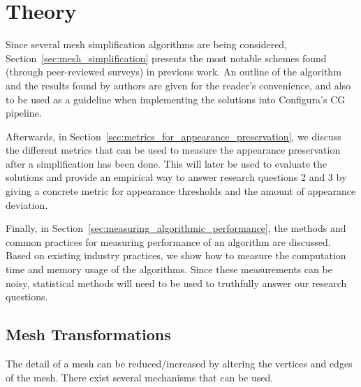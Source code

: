 
\chapter{Theory} \label{ch:theory}

Since several mesh simplification algorithms are being considered, Section~\ref{sec:mesh_simplification} presents the most notable schemes found (through peer-reviewed surveys) in previous work. An outline of the algorithm and the results found by authors are given for the reader's convenience, and also to be used as a guideline when implementing the solutions into Configura's CG pipeline.

Afterwards, in Section~\ref{sec:metrics_for_appearance_preservation}, we discuss the different metrics that can be used to measure the appearance preservation after a simplification has been done. This will later be used to evaluate the solutions and provide an empirical way to answer research questions 2 and 3 by giving a concrete metric for appearance thresholds and the amount of appearance deviation.

Finally, in Section~\ref{sec:measuring_algorithmic_performance}, the methods and common practices for measuring performance of an algorithm are discussed. Based on existing industry practices, we show how to measure the computation time and memory usage of the algorithms. Since these measurements can be noisy, statistical methods will need to be used to truthfully answer our research questions.


\section{Mesh Transformations} \label{sec:mesh_transformations}
The detail of a mesh can be reduced/increased by altering the vertices and edges of the mesh. There exist several mechanisms that can be used.

